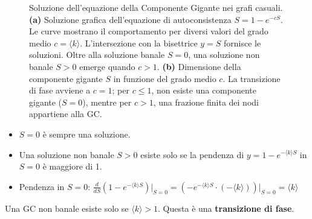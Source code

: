 \begin{figure}[htbp]
    \caption{Soluzione dell'equazione della Componente Gigante nei grafi casuali. \textbf{(a)} Soluzione grafica dell'equazione di autoconsistenza $S = 1 - e^{-cS}$. Le curve mostrano il comportamento per diversi valori del grado medio $c = \langle k \rangle$. L'intersezione con la bisettrice $y=S$ fornisce le soluzioni. Oltre alla soluzione banale $S=0$, una soluzione non banale $S>0$  emerge quando $c > 1$. \textbf{(b)} Dimensione della componente gigante $S$ in funzione del grado medio $c$. La transizione di fase avviene a $c=1$; per $c \le 1$, non esiste una componente gigante ($S=0$), mentre per $c > 1$, una frazione finita dei nodi appartiene alla GC.}
    \label{fig:giant_component_transition}
\end{figure}

\begin{itemize}
\item $S=0$ è sempre una soluzione.
\item Una soluzione non banale $S > 0$ esiste solo se la pendenza di $y=1-e^{-\langle k \rangle S}$ in $S=0$ è maggiore di 1.
\item Pendenza in $S=0$: $\frac{d}{dS} \left( 1 - e^{-\langle k \rangle S} \right) \bigg|_{S=0} = \left( -e^{-\langle k \rangle S} \cdot (-\langle k \rangle) \right) \bigg|_{S=0} = \langle k \rangle$
\end{itemize}
Una GC non banale esiste solo se $\langle k \rangle > 1$. Questa è una \textbf{transizione di fase}.

